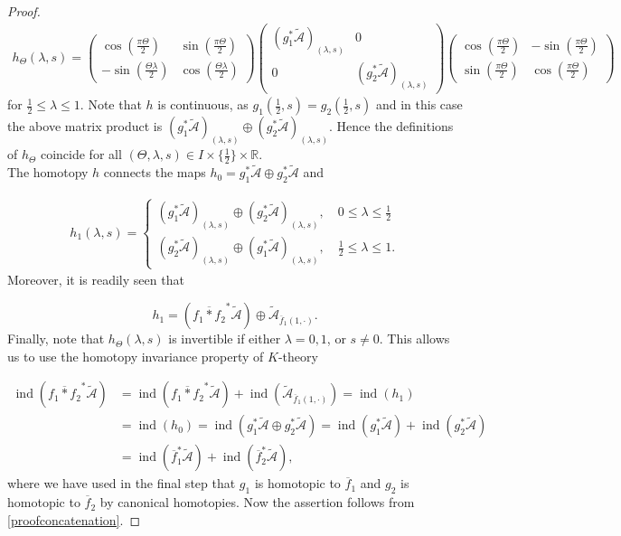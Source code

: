 \documentclass[a4paper,10pt]{article}
\DeclareMathOperator{\ind}{ind}
\begin{document}
\begin{proof}
\begin{align*}
h_\Theta(\lambda,s)=
\begin{pmatrix}
\cos\left(\frac{\pi\Theta}{2}\right)&\sin\left(\frac{\pi\Theta}{2}\right)\\
-\sin\left(\frac{\Theta\lambda}{2}\right)&\cos\left(\frac{\Theta\lambda}{2}\right)
\end{pmatrix}
\begin{pmatrix}
(g^\ast_1\tilde{\mathcal{A}})_{(\lambda,s)}&0\\
0&(g^\ast_2\tilde{\mathcal{A}})_{(\lambda,s)}
\end{pmatrix}
\begin{pmatrix}
\cos\left(\frac{\pi\Theta}{2}\right)&-\sin\left(\frac{\pi\Theta}{2}\right)\\
\sin\left(\frac{\pi\Theta}{2}\right)&\cos\left(\frac{\pi\Theta}{2}\right)
\end{pmatrix}
\end{align*}
for $\frac{1}{2}\leq \lambda\leq 1$. 
Note that $h$ is continuous, as $g_1(\frac{1}{2},s)=g_2(\frac{1}{2},s)$ and in this case the above matrix product is $(g^\ast_1\tilde{\mathcal{A}})_{(\lambda,s)}\oplus(g^\ast_2\tilde{\mathcal{A}})_{(\lambda,s)}$. Hence the definitions of $h_\Theta$ coincide for all $(\Theta,\lambda,s)\in I\times\{\frac{1}{2}\}\times\mathbb{R}$.\\
The homotopy $h$ connects the maps $h_0=g^\ast_1\tilde{\mathcal{A}}\oplus g^\ast_2\tilde{\mathcal{A}}$ and 

\begin{align*}
h_1(\lambda,s)=\begin{cases}
(g^\ast_1\tilde{\mathcal{A}})_{(\lambda,s)}\oplus(g^\ast_2\tilde{\mathcal{A}})_{(\lambda,s)},\quad 0\leq \lambda\leq\frac{1}{2}\\
(g^\ast_2\tilde{\mathcal{A}})_{(\lambda,s)}\oplus (g^\ast_1\tilde{\mathcal{A}})_{(\lambda,s)},\quad\frac{1}{2}\leq \lambda\leq 1.
\end{cases}
\end{align*} 
Moreover, it is readily seen that 

\[h_1=(\overline{f_1\ast f_2}^\ast\tilde{\mathcal{A}})\oplus\tilde{\mathcal{A}}_{\overline{f}_1(1,\cdot)}.\]
Finally, note that $h_\Theta(\lambda,s)$ is invertible if either $\lambda=0,1$, or $s\neq 0$. This allows us to use the homotopy invariance property of $K$-theory

\begin{align*}
\ind(\overline{f_1\ast f_2}^\ast\tilde{\mathcal{A}})&=\ind(\overline{f_1\ast f_2}^\ast\tilde{\mathcal{A}})+\ind(\tilde{\mathcal{A}}_{\overline{f}_1(1,\cdot)})=\ind(h_1)\\
&=\ind(h_0)=\ind(g^\ast_1\tilde{\mathcal{A}}\oplus g^\ast_2\tilde{\mathcal{A}})=\ind(g^\ast_1\tilde{\mathcal{A}})+\ind(g^\ast_2\tilde{\mathcal{A}})\\
&=\ind(\overline{f}^\ast_1\tilde{\mathcal{A}})+\ind(\overline{f}^\ast_2\tilde{\mathcal{A}}),
\end{align*} 
where we have used in the final step that $g_1$ is homotopic to $\overline{f}_1$ and $g_2$ is homotopic to $\overline{f}_2$ by canonical homotopies. Now the assertion follows from \eqref{proofconcatenation}.
\end{proof}
\end{document}

